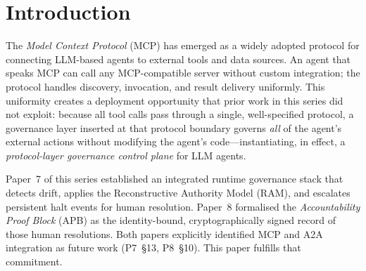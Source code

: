 \documentclass[11pt]{article}
\begin{document}
\begin{abstract}
We evaluate the construction with five experiments, all in-process
and with a simulated agent (\texttt{MockLLM}) and a simulated
auto-approving human.
\emph{E1}~(latency): $10{,}000$ governed calls; the windowed IML monitor
has a P95 \emph{decision} overhead of $51.8\,\si{\micro\second}$ against an
in-memory call (not the overhead of real stdio/JSON-RPC transport).
\emph{E2}~(\texttt{MockLLM} agent, $5$ seeds $\times$ $200$ steps): $310$
HALT events; every APB verifies. A live-LLM variant was not run.
\emph{E3}~(multi-hop A2A, depths $1$--$5$): $334$ HALT events; the
configured chain is copied into the evidence block in $100\%$ of cases.
\emph{E4}~(concurrency, independent sessions): $N \in \{1,4,16,64\}$
threads, $0$ exceptions.
\emph{E5}~(adversarial regression suite): the attack vectors
(wrong-key signing, evidence tampering, replay, revoked principal,
authority substitution, and a cross-call APB) are rejected; this is a
regression suite written by the author, not a measure of security.
A revision note (\S\ref{sec:discussion}) lists what an audit of the first
release found and what was changed or withdrawn.
\end{abstract}

\section{Introduction}
\label{sec:intro}

The \emph{Model Context Protocol} (MCP) \citep{anthropic2024mcp} has
emerged as a widely adopted protocol for connecting LLM-based agents to
external tools and data sources. An agent that speaks MCP can call any
MCP-compatible server without custom integration; the protocol handles
discovery, invocation, and result delivery uniformly. This uniformity
creates a deployment opportunity that prior work in this series did not
exploit: because all tool calls pass through a single, well-specified
protocol, a governance layer inserted at that protocol boundary
governs \emph{all} of the agent's external actions without modifying
the agent's code---instantiating, in effect, a
\emph{protocol-layer governance control plane} for LLM agents.

Paper~7 of this series \citep{fernandez2026applied} established an
integrated runtime governance stack that detects drift, applies the
Reconstructive Authority Model (RAM), and escalates persistent halt
events for human resolution. Paper~8 \citep{fernandez2026ibg}
formalised the \emph{Accountability Proof Block} (APB) as the
identity-bound, cryptographically signed record of those human
resolutions. Both papers explicitly identified MCP and A2A integration
as future work (P7~\S13, P8~\S10). This paper fulfills that commitment.
\end{document}

